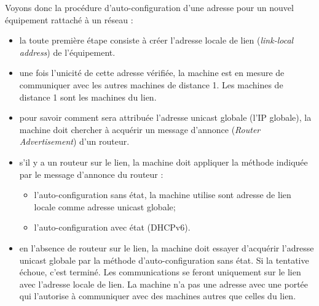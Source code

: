\newpage
Voyons donc la procédure d’auto-configuration d’une adresse pour un nouvel équipement rattaché à un réseau :
\begin{itemize}
  \item la toute première étape consiste à créer l'adresse locale de lien (\textit{link-local address}) de l’équipement.
  \item une fois l'unicité de cette adresse vérifiée, la machine est en mesure de communiquer avec les autres machines de distance 1. Les machines de distance 1 sont les machines du lien.
  \item pour savoir comment sera attribuée l’adresse unicast globale (l’IP globale), la machine doit chercher à acquérir un message d'annonce (\textit{Router Advertisement}) d’un routeur.
  \item s'il y a un routeur sur le lien, la machine doit appliquer la méthode indiquée par le message d'annonce du routeur :
    \begin{itemize}
      \item l'auto-configuration sans état, la machine utilise sont adresse de lien locale comme adresse unicast globale;
      \item l'auto-configuration avec état (DHCPv6).
    \end{itemize}
  \item en l'absence de routeur sur le lien, la machine doit essayer d'acquérir l'adresse unicast globale par la méthode d'auto-configuration sans état. Si la tentative échoue, c'est terminé. Les communications se feront uniquement sur le lien avec l'adresse locale de lien. La machine n'a pas une adresse avec une portée qui l'autorise à communiquer avec des machines autres que celles du lien.
\end{itemize}


